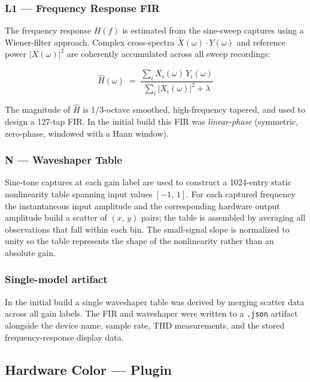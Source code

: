 \documentclass[11pt, letterpaper]{article}
\begin{document}
\subsubsection*{L1 — Frequency Response FIR}

The frequency response $H(f)$ is estimated from the sine-sweep captures using
a Wiener-filter approach.  Complex cross-spectra
$\overline{X}(\omega) \cdot Y(\omega)$ and reference power $|X(\omega)|^2$
are coherently accumulated across all sweep recordings:

\begin{equation}
    \hat{H}(\omega)
    \;=\;
    \frac{\sum_i \overline{X_i}(\omega)\, Y_i(\omega)}
         {\sum_i |X_i(\omega)|^2 + \lambda}
\end{equation}

The magnitude of $\hat{H}$ is 1/3-octave smoothed, high-frequency tapered, and
used to design a 127-tap FIR.  In the initial build this FIR was
\emph{linear-phase} (symmetric, zero-phase, windowed with a Hann window).

\subsubsection*{N — Waveshaper Table}

Sine-tone captures at each gain label are used to construct a 1024-entry
static nonlinearity table spanning input values $[-1,\,1]$.  For each captured
frequency the instantaneous input amplitude and the corresponding hardware
output amplitude build a scatter of $(x,\,y)$ pairs; the table is assembled by
averaging all observations that fall within each bin.  The small-signal slope
is normalized to unity so the table represents the shape of the nonlinearity
rather than an absolute gain.

\subsubsection*{Single-model artifact}

In the initial build a single waveshaper table was derived by merging scatter
data across all gain labels.  The FIR and waveshaper were written to a
\texttt{.json} artifact alongside the device name, sample rate, THD
measurements, and the stored frequency-response display data.

\subsection{Hardware Color — Plugin}
\end{document}
